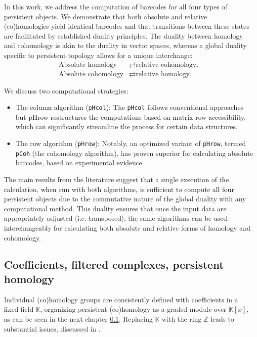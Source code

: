 In this work, we address the computation of barcodes for all four types of persistent objects. We demonstrate that both absolute and relative (co)homologies yield identical barcodes and that transitions between these states are facilitated by established duality principles. The duality between homology and cohomology is akin to the duality in vector spaces, whereas a global duality specific to persistent topology allows for a unique interchange:
\begin{align*}
	\text{Absolute homology} &\rightleftarrows \text{relative cohomology.} \\
	\text{Absolute cohomology} &\rightleftarrows \text{relative homology.}
\end{align*}

We discuss two computational strategies:
\begin{itemize}
	\item The column algorithm (\texttt{pHcol}): The \texttt{pHcol} follows conventional approaches but pHrow restructures the computations based on matrix row accessibility, which can significantly streamline the process for certain data structures.
	\item The row algorithm (\texttt{pHrow}): Notably, an optimized variant of \texttt{pHrow}, termed \texttt{pCoh} (the cohomology algorithm), has proven superior for calculating absolute barcodes, based on experimental evidence.
\end{itemize}

The main results from the literature suggest that a single execution of the calculation, when run with both algorithms, is sufficient to compute all four persistent objects due to the commutative nature of the global duality with any computational method. This duality ensures that once the input data are appropriately adjusted (i.e. transposed), the same algorithms can be used interchangeably for calculating both absolute and relative forms of homology and cohomology.

\subsection{Coefficients, filtered complexes, persistent homology}
Individual (co)homology groups are consistently defined with coefficients in a fixed field $\mathbb{K}$, organizing persistent (co)homology as a graded module over $\mathbb{K}[x]$, as can be seen in the next chapter \ref{}. Replacing $\mathbb{K}$ with the ring $\mathbb{Z}$ leads to substantial issues, discussed in \cite[§3.1]{zomorodian2004computing}.

